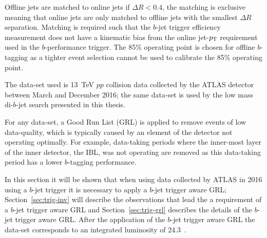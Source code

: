 Offline jets are matched to online jets if $\Delta R < 0.4$,
the matching is exclusive meaning that online jets are only matched to offline jets with the smallest $\Delta R$ separation.
Matching is required such that the $b$-jet trigger efficiency measurement does not have a kinematic bias
from the online jet-$p_{\mathrm{T}}$ requirement used in the $b$-performance trigger.
The 85\% operating point is chosen for offline $b$-tagging as a tighter event selection
cannot be used to calibrate the 85\% operating point.



The data-set used is 13~TeV $pp$ collision data collected by the ATLAS detector between March and December 2016;
the same data-set is used by the low mass di-$b$-jet search presented in this thesis. %

For any data-set, a Good Run List (GRL)
is applied to remove events of low data-quality,
which is typically caused by an element of the detector not operating optimally.
For example, data-taking periods where the inner-most layer of the inner detector,
the IBL, was not operating are removed as
this data-taking period has a lower $b$-tagging performance.

In this section it will be shown that when using data collected by ATLAS in 2016 using a $b$-jet trigger
it is necessary to apply a $b$-jet trigger aware GRL;
Section~\ref{sec:trig-inv} will describe the observations that lead the a requirement of a $b$-jet trigger aware GRL
and Section~\ref{sec:trig-grl} describes the details of the $b$-jet trigger aware GRL.
After the application of the $b$-jet trigger aware GRL the data-set corresponds to an integrated luminosity of 24.3~\ifb.


